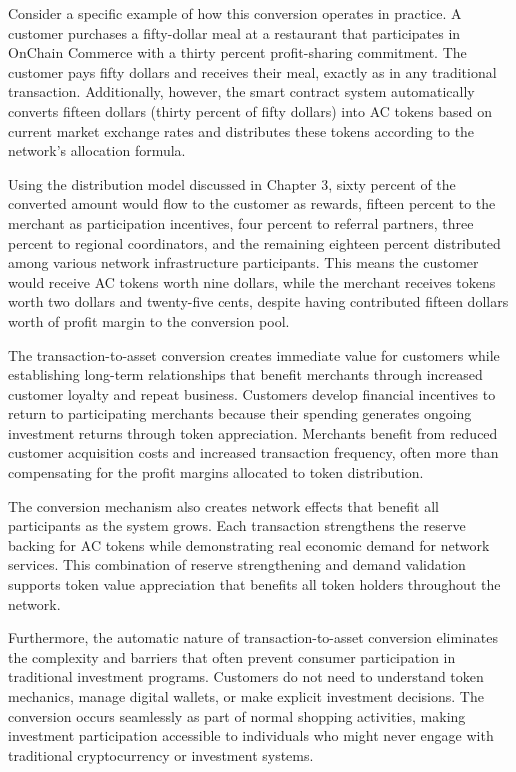 \documentclass[
  Letterpaper,
]{scrbook}
\begin{document}
Consider a specific example of how this conversion operates in practice.
A customer purchases a fifty-dollar meal at a restaurant that
participates in OnChain Commerce with a thirty percent profit-sharing
commitment. The customer pays fifty dollars and receives their meal,
exactly as in any traditional transaction. Additionally, however, the
smart contract system automatically converts fifteen dollars (thirty
percent of fifty dollars) into AC tokens based on current market
exchange rates and distributes these tokens according to the network's
allocation formula.

Using the distribution model discussed in Chapter 3, sixty percent of
the converted amount would flow to the customer as rewards, fifteen
percent to the merchant as participation incentives, four percent to
referral partners, three percent to regional coordinators, and the
remaining eighteen percent distributed among various network
infrastructure participants. This means the customer would receive AC
tokens worth nine dollars, while the merchant receives tokens worth two
dollars and twenty-five cents, despite having contributed fifteen
dollars worth of profit margin to the conversion pool.

The transaction-to-asset conversion creates immediate value for
customers while establishing long-term relationships that benefit
merchants through increased customer loyalty and repeat business.
Customers develop financial incentives to return to participating
merchants because their spending generates ongoing investment returns
through token appreciation. Merchants benefit from reduced customer
acquisition costs and increased transaction frequency, often more than
compensating for the profit margins allocated to token distribution.

The conversion mechanism also creates network effects that benefit all
participants as the system grows. Each transaction strengthens the
reserve backing for AC tokens while demonstrating real economic demand
for network services. This combination of reserve strengthening and
demand validation supports token value appreciation that benefits all
token holders throughout the network.

Furthermore, the automatic nature of transaction-to-asset conversion
eliminates the complexity and barriers that often prevent consumer
participation in traditional investment programs. Customers do not need
to understand token mechanics, manage digital wallets, or make explicit
investment decisions. The conversion occurs seamlessly as part of normal
shopping activities, making investment participation accessible to
individuals who might never engage with traditional cryptocurrency or
investment systems.
\end{document}
